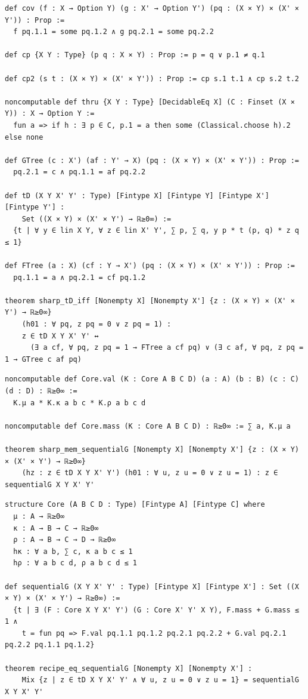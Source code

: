 \begin{lstlisting}
def cov (f : X → Option Y) (g : X' → Option Y') (pq : (X × Y) × (X' × Y')) : Prop :=
  f pq.1.1 = some pq.1.2 ∧ g pq.2.1 = some pq.2.2

def cp {X Y : Type} (p q : X × Y) : Prop := p = q ∨ p.1 ≠ q.1

def cp2 (s t : (X × Y) × (X' × Y')) : Prop := cp s.1 t.1 ∧ cp s.2 t.2

noncomputable def thru {X Y : Type} [DecidableEq X] (C : Finset (X × Y)) : X → Option Y :=
  fun a => if h : ∃ p ∈ C, p.1 = a then some (Classical.choose h).2 else none

def GTree (c : X') (af : Y' → X) (pq : (X × Y) × (X' × Y')) : Prop :=
  pq.2.1 = c ∧ pq.1.1 = af pq.2.2

def tD (X Y X' Y' : Type) [Fintype X] [Fintype Y] [Fintype X'] [Fintype Y'] :
    Set ((X × Y) × (X' × Y') → ℝ≥0∞) :=
  {t | ∀ y ∈ lin X Y, ∀ z ∈ lin X' Y', ∑ p, ∑ q, y p * t (p, q) * z q ≤ 1}

def FTree (a : X) (cf : Y → X') (pq : (X × Y) × (X' × Y')) : Prop :=
  pq.1.1 = a ∧ pq.2.1 = cf pq.1.2

theorem sharp_tD_iff [Nonempty X] [Nonempty X'] {z : (X × Y) × (X' × Y') → ℝ≥0∞}
    (h01 : ∀ pq, z pq = 0 ∨ z pq = 1) :
    z ∈ tD X Y X' Y' ↔
      (∃ a cf, ∀ pq, z pq = 1 → FTree a cf pq) ∨ (∃ c af, ∀ pq, z pq = 1 → GTree c af pq)
\end{lstlisting}

\begin{lstlisting}
noncomputable def Core.val (K : Core A B C D) (a : A) (b : B) (c : C) (d : D) : ℝ≥0∞ :=
  K.μ a * K.κ a b c * K.ρ a b c d

noncomputable def Core.mass (K : Core A B C D) : ℝ≥0∞ := ∑ a, K.μ a

theorem sharp_mem_sequentialG [Nonempty X] [Nonempty X'] {z : (X × Y) × (X' × Y') → ℝ≥0∞}
    (hz : z ∈ tD X Y X' Y') (h01 : ∀ u, z u = 0 ∨ z u = 1) : z ∈ sequentialG X Y X' Y'
\end{lstlisting}

\begin{lstlisting}
structure Core (A B C D : Type) [Fintype A] [Fintype C] where
  μ : A → ℝ≥0∞
  κ : A → B → C → ℝ≥0∞
  ρ : A → B → C → D → ℝ≥0∞
  hκ : ∀ a b, ∑ c, κ a b c ≤ 1
  hρ : ∀ a b c d, ρ a b c d ≤ 1

def sequentialG (X Y X' Y' : Type) [Fintype X] [Fintype X'] : Set ((X × Y) × (X' × Y') → ℝ≥0∞) :=
  {t | ∃ (F : Core X Y X' Y') (G : Core X' Y' X Y), F.mass + G.mass ≤ 1 ∧
    t = fun pq => F.val pq.1.1 pq.1.2 pq.2.1 pq.2.2 + G.val pq.2.1 pq.2.2 pq.1.1 pq.1.2}

theorem recipe_eq_sequentialG [Nonempty X] [Nonempty X'] :
    Mix {z | z ∈ tD X Y X' Y' ∧ ∀ u, z u = 0 ∨ z u = 1} = sequentialG X Y X' Y'
\end{lstlisting}

